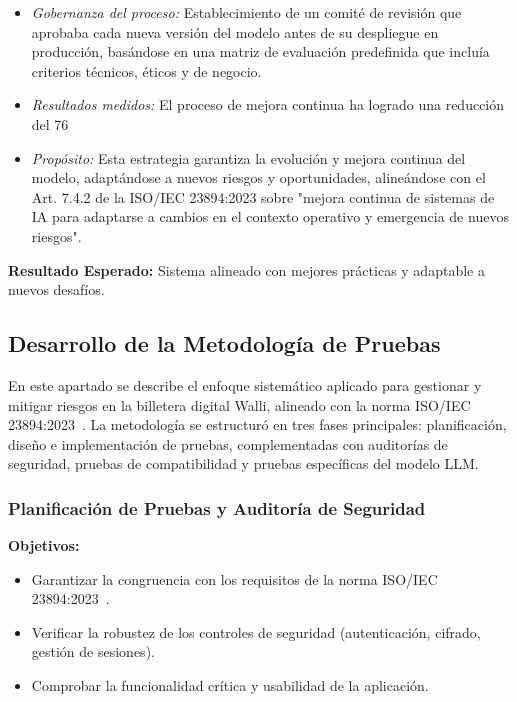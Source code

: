 \documentclass[12pt]{article}
\begin{document}
\begin{enumerate}
\begin{itemize}
\begin{itemize}
            \end{itemize}
            \item \textit{Gobernanza del proceso:} Establecimiento de un comité de revisión que aprobaba cada nueva versión del modelo antes de su despliegue en producción, basándose en una matriz de evaluación predefinida que incluía criterios técnicos, éticos y de negocio.
            \item \textit{Resultados medidos:} El proceso de mejora continua ha logrado una reducción del 76%
            \item \textit{Propósito:} Esta estrategia garantiza la evolución y mejora continua del modelo, adaptándose a nuevos riesgos y oportunidades, alineándose con el Art. 7.4.2 de la ISO/IEC 23894:2023 sobre "mejora continua de sistemas de IA para adaptarse a cambios en el contexto operativo y emergencia de nuevos riesgos".
        \end{itemize}
\end{enumerate}

\textbf{Resultado Esperado:} Sistema alineado con mejores prácticas y adaptable a nuevos desafíos.

\subsection{Desarrollo de la Metodología de Pruebas}

En este apartado se describe el enfoque sistemático aplicado para gestionar y mitigar riesgos en la billetera digital Walli, alineado con la norma ISO/IEC 23894:2023~\cite{iso23894}. La metodología se estructuró en tres fases principales: planificación, diseño e implementación de pruebas, complementadas con auditorías de seguridad, pruebas de compatibilidad y pruebas específicas del modelo LLM.

\subsubsection{Planificación de Pruebas y Auditoría de Seguridad}

\textbf{Objetivos:}
\begin{itemize}
    \item Garantizar la congruencia con los requisitos de la norma ISO/IEC 23894:2023~\cite{iso23894}.
    \item Verificar la robustez de los controles de seguridad (autenticación, cifrado, gestión de sesiones).
    \item Comprobar la funcionalidad crítica y usabilidad de la aplicación.
\end{itemize}
\end{document}
